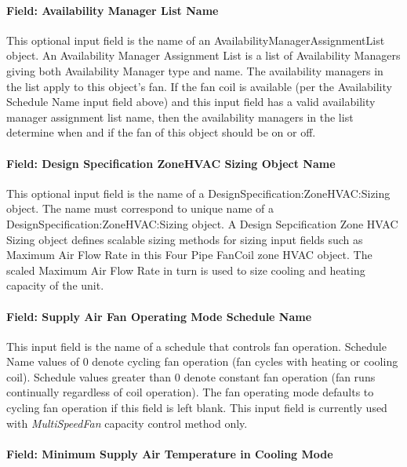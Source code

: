 \paragraph{Field: Availability Manager List Name}\label{field-availability-manager-list-name-002}

This optional input field is the name of an AvailabilityManagerAssignmentList object. An Availability Manager Assignment List is a list of Availability Managers giving both Availability Manager type and name. The availability managers in the list apply to this object's fan. If the fan coil is available (per the Availability Schedule Name input field above) and this input field has a valid availability manager assignment list name, then the availability managers in the list determine when and if the fan of this object should be on or off.

\paragraph{Field: Design Specification ZoneHVAC Sizing Object Name}\label{field-design-specification-zonehvac-sizing-object-name-1}

This optional input field is the name of a DesignSpecification:ZoneHVAC:Sizing object. The name must correspond to unique name of a DesignSpecification:ZoneHVAC:Sizing object. A Design Sepcification Zone HVAC Sizing object defines scalable sizing methods for sizing input fields such as Maximum Air Flow Rate in this Four Pipe FanCoil zone HVAC object. The scaled Maximum Air Flow Rate in turn is used to size cooling and heating capacity of the unit.

\paragraph{Field: Supply Air Fan Operating Mode Schedule Name}\label{field-supply-air-fan-operating-mode-schedule-name-000}

This input field is the name of a schedule that controls fan operation. Schedule Name values of 0 denote cycling fan operation (fan cycles with heating or cooling coil). Schedule values greater than 0 denote constant fan operation (fan runs continually regardless of coil operation). The fan operating mode defaults to cycling fan operation if this field is left blank. This input field is currently used with \emph{MultiSpeedFan} capacity control method only.

\paragraph{Field: Minimum Supply Air Temperature in Cooling Mode}\label{field-minimum-supply-air-temperature-in-cooling-mode}

